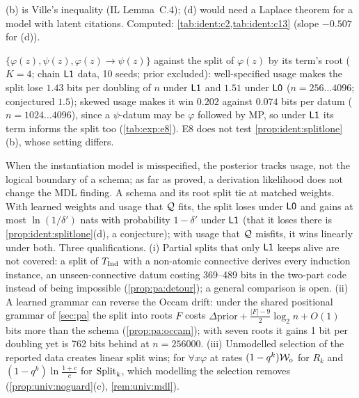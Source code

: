 \noindent (b) is Ville's inequality (IL Lemma~C.4); (d) would need a Laplace theorem for a model with latent citations. Computed: \cref{tab:ident:c2,tab:ident:c13} (slope $-0.507$ for (d)).

\begin{remark}\label{rem:ident:e8}
$\{\varphi(z),\psi(z),\varphi(z)\to\psi(z)\}$ against the split of $\varphi(z)$ by its term's root ($K=4$; chain $\mathord{\mathsf{L1}}$ data, 10 seeds; prior excluded): well-specified usage makes the split lose $1.43$ bits per doubling of $n$ under $\mathord{\mathsf{L1}}$ and $1.51$ under $\mathord{\mathsf{L0}}$ ($n=256\ldots4096$; conjectured $1.5$); skewed usage makes it win $0.202$ against $0.074$ bits per datum ($n=1024\ldots4096$), since a $\psi$-datum may be $\varphi$ followed by MP, so under $\mathord{\mathsf{L1}}$ its term informs the split too (\cref{tab:exp:e8}). E8 does not test \cref{prop:ident:splitlone}(b), whose setting differs.
\end{remark}

\begin{remark}\label{rem:ident:mdl}
When the instantiation model is misspecified, the posterior tracks usage, not the logical boundary of a schema; as far as proved, a derivation likelihood does not change the MDL finding. A schema and its root split tie at matched weights. With learned weights and usage that $\mathcal{Q}$ fits, the split loses under $\mathord{\mathsf{L0}}$ and gains at most $\ln(1/\delta')$ nats with probability $1-\delta'$ under $\mathord{\mathsf{L1}}$ (that it loses there is \cref{prop:ident:splitlone}(d), a conjecture); with usage that $\mathcal{Q}$ misfits, it wins linearly under both. Three qualifications.
(i) Partial splits that only $\mathord{\mathsf{L1}}$ keeps alive are not covered: a split of $T_{\mathrm{Ind}}$ with a non-atomic connective derives every induction instance, an unseen-connective datum costing 369--489 bits in the two-part code instead of being impossible (\cref{prop:pa:detour}); a general comparison is open.
(ii) A learned grammar can reverse the Occam drift: under the shared positional grammar of \cref{sec:pa} the split into roots $F$ costs $\Delta\mathrm{prior}+\frac{|F|-9}2\log_2n+O(1)$ bits more than the schema (\cref{prop:pa:occam}); with seven roots it gains 1 bit per doubling yet is 762 bits behind at $n=256000$.
(iii) Unmodelled selection of the reported data creates linear split wins; for $\forall x\varphi$ at rates $(1-q^k)\mathcal{W}_{\mathrm{o}}$ for $R_k$ and $(1-q^k)\ln\frac{1+c}c$ for $\mathrm{Split}_k$, which modelling the selection removes (\cref{prop:univ:noguard}(c), \cref{rem:univ:mdl}).
\end{remark}


